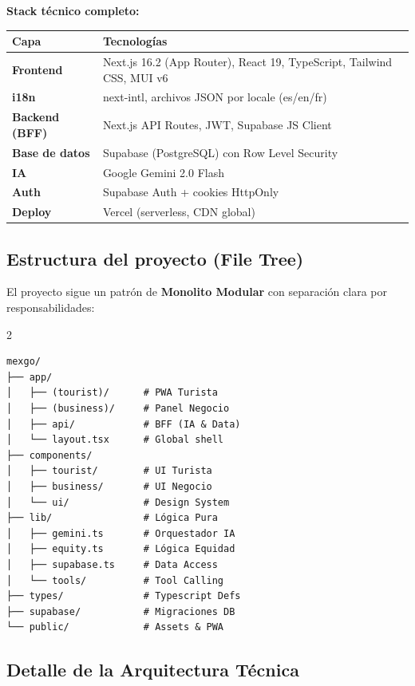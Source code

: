 \documentclass[11pt,a4paper]{article}
\begin{document}
\textbf{Stack técnico completo:}

\begin{center}
\begin{tabular}{>{\bfseries}p{3.5cm} p{10cm}}
\toprule
Capa & Tecnologías \\
\midrule
Frontend       & Next.js 16.2 (App Router), React 19, TypeScript, Tailwind CSS, MUI v6 \\
i18n           & next-intl, archivos JSON por locale (es/en/fr) \\
Backend (BFF)  & Next.js API Routes, JWT, Supabase JS Client \\
Base de datos  & Supabase (PostgreSQL) con Row Level Security \\
IA             & Google Gemini 2.0 Flash \\
Auth           & Supabase Auth + cookies HttpOnly \\
Deploy         & Vercel (serverless, CDN global) \\
\bottomrule
\end{tabular}
\end{center}

\subsection{Estructura del proyecto (File Tree)}

El proyecto sigue un patrón de \textbf{Monolito Modular} con separación clara por responsabilidades:

\begin{multicols}{2}
\begin{verbatim}
mexgo/
├── app/
│   ├── (tourist)/      # PWA Turista
│   ├── (business)/     # Panel Negocio
│   ├── api/            # BFF (IA & Data)
│   └── layout.tsx      # Global shell
├── components/
│   ├── tourist/        # UI Turista
│   ├── business/       # UI Negocio
│   └── ui/             # Design System
├── lib/                # Lógica Pura
│   ├── gemini.ts       # Orquestador IA
│   ├── equity.ts       # Lógica Equidad
│   ├── supabase.ts     # Data Access
│   └── tools/          # Tool Calling
├── types/              # Typescript Defs
├── supabase/           # Migraciones DB
└── public/             # Assets & PWA
\end{verbatim}
\end{multicols}

\subsection{Detalle de la Arquitectura Técnica}
\end{document}
